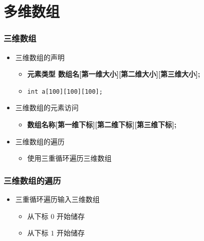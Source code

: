 \section{多维数组}

\begin{frame}[fragile]
    \frametitle{三维数组}

    \begin{itemize}
        \item<1-> 三维数组的声明
            \begin{itemize}
                \item<1-> \textbf{元素类型 \enspace 数组名[第一维大小][第二维大小][第三维大小];}
                \item<1-> \lstinline|int a[100][100][100];|
            \end{itemize}
        \item<2-> 三维数组的元素访问
            \begin{itemize}
                \item<2-> \textbf{数组名称[第一维下标][第二维下标][第三维下标];}
            \end{itemize}
        \item<3-> 三维数组的遍历
            \begin{itemize}
                \item<3-> 使用三重循环遍历三维数组
            \end{itemize}
    \end{itemize}
\end{frame}

\begin{frame}[fragile]
    \frametitle{三维数组的遍历}

    \begin{itemize}
        \item 三重循环遍历输入三维数组

            \begin{itemize}
                \item<2-> 从下标 $0$ 开始储存
                \item<4-> 从下标 $1$ 开始储存
            \end{itemize}
    \end{itemize}
\end{frame}

